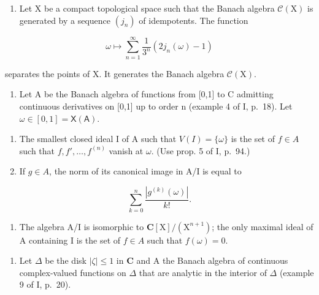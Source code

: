 \begin{enumerate}
\def\labelenumi{\arabic{enumi})}
\setcounter{enumi}{3}
\tightlist
\item
  Let X be a compact topological space such that the Banach algebra \(\mathcal{C}(\mathrm{X})\) is generated by a sequence \((j_n)\) of idempotents. The function
\end{enumerate}

\[
\omega \mapsto \sum_ {n = 1} ^ {\infty} \frac {1}{3 ^ {n}} (2 j _ {n} (\omega) - 1)
\]

separates the points of X. It generates the Banach algebra \(\mathcal{C}(\mathrm{X})\).

\begin{enumerate}
\def\labelenumi{\arabic{enumi})}
\setcounter{enumi}{4}
\tightlist
\item
  Let A be the Banach algebra of functions from {[}0,1{]} to C admitting continuous derivatives on {[}0,1{]} up to order n (example 4 of I, p.~18). Let \(\omega \in [0,1] = \mathsf{X}(\mathsf{A})\).
\end{enumerate}

\begin{enumerate}
\def\labelenumi{\alph{enumi})}
\item
  The smallest closed ideal I of A such that \(V(I) = \{\omega\}\) is the set of \(f \in A\) such that \(f, f', \ldots, f^{(n)}\) vanish at \(\omega\). (Use prop. 5 of I, p.~94.)
\item
  If \(g \in A\), the norm of its canonical image in A/I is equal to
\end{enumerate}

\[
\sum_ {k = 0} ^ {n} \frac {| g ^ {(k)} (\omega) |}{k !}.
\]

\begin{enumerate}
\def\labelenumi{\alph{enumi})}
\setcounter{enumi}{2}
\tightlist
\item
  The algebra A/I is isomorphic to \(\mathbf{C}[\mathrm{X}]/(\mathrm{X}^{n+1})\); the only maximal ideal of A containing I is the set of \(f \in A\) such that \(f(\omega) = 0\).
\end{enumerate}

\begin{enumerate}
\def\labelenumi{\arabic{enumi})}
\setcounter{enumi}{5}
\tightlist
\item
  Let \(\Delta\) be the disk \(|\zeta| \leqslant 1\) in \(\mathbf{C}\) and A the Banach algebra of continuous complex-valued functions on \(\Delta\) that are analytic in the interior of \(\Delta\) (example 9 of I, p.~20).
\end{enumerate}

